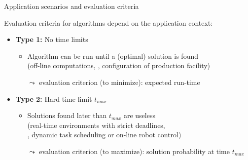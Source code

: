 \begin{frame}[c]{Application scenarios and evaluation criteria}

Evaluation criteria for algorithms depend on the application context:

\bigskip

\begin{itemize}
\item {\bf Type 1:} \alert{No time limits} 
	\begin{itemize}
		\item Algorithm can be run until a (optimal) solution is found\\(off-line computations, \eg{}, configuration of production facility)
        
        \medskip
        \item[$\leadsto$] evaluation criterion (to minimize): \alert{expected run-time}
	\end{itemize}
        
\pause
\bigskip

\item {\bf Type 2:} \alert{Hard time limit $t_{max}$} 
	\begin{itemize}
		\item Solutions found later than $t_{max}$ are useless\\
        (real-time environments with strict deadlines,\\ \eg{}, dynamic task scheduling or on-line robot control)
        
        \medskip
        \item[$\leadsto$] evaluation criterion (to maximize): \alert{solution probability at time $t_{max}$}
	\end{itemize}
\end{itemize}

\end{frame}

